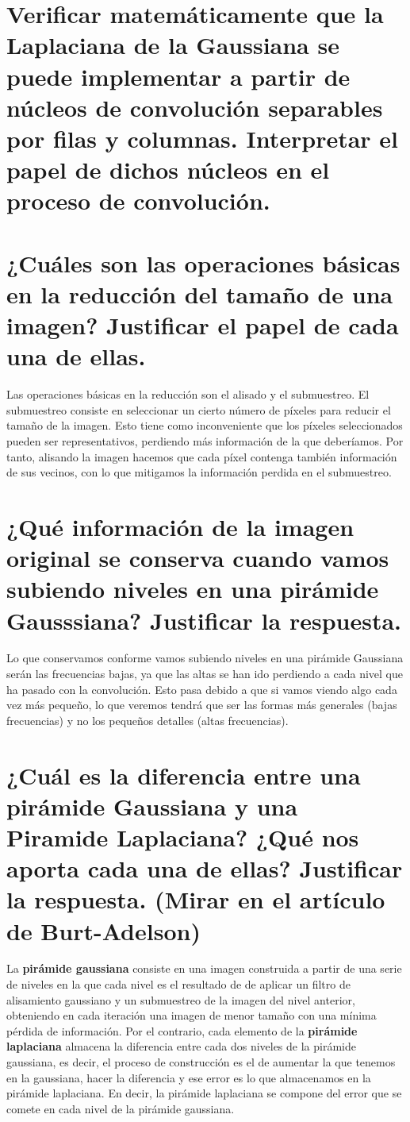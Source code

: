 \section{Verificar matemáticamente que la Laplaciana de la Gaussiana se puede implementar a partir de núcleos de convolución separables por filas y columnas. Interpretar el papel de dichos núcleos en el proceso de convolución.}

\section{¿Cuáles son las operaciones básicas en la reducción del tamaño de una imagen? Justificar el papel de cada una de ellas.}

Las operaciones básicas en la reducción son el alisado y el submuestreo. 
El submuestreo consiste en seleccionar un cierto número de píxeles para reducir el tamaño de la imagen. Esto tiene como inconveniente que los píxeles seleccionados pueden ser representativos, perdiendo más información de la que deberíamos. Por tanto, alisando la imagen hacemos que cada píxel contenga también información de sus vecinos, con lo que mitigamos la información perdida en el submuestreo.


\section{¿Qué información de la imagen original se conserva cuando vamos subiendo niveles en una pirámide Gausssiana? Justificar la respuesta.}

Lo que conservamos conforme vamos subiendo niveles en una pirámide Gaussiana serán las frecuencias bajas, ya que las altas se han ido perdiendo a cada nivel que ha pasado con la convolución. Esto pasa debido a que si vamos viendo algo cada vez más pequeño, lo que veremos tendrá que ser las formas más generales (bajas frecuencias) y no los pequeños detalles (altas frecuencias).


\section{¿Cuál es la diferencia entre una pirámide Gaussiana y una Piramide Laplaciana? ¿Qué nos aporta cada una de ellas? Justificar la respuesta. (Mirar en el artículo de Burt-Adelson)}

La \textbf{pirámide gaussiana} consiste en una imagen construida a partir de una serie de niveles en la que cada nivel es el resultado de de aplicar un filtro de alisamiento gaussiano y un submuestreo de la imagen del nivel anterior, obteniendo en cada iteración una imagen de menor tamaño con una mínima pérdida de información. Por el contrario, cada elemento de la\textbf{ pirámide laplaciana} almacena la diferencia entre cada dos niveles de la pirámide gaussiana, es decir, el proceso de construcción es el de aumentar la que tenemos en la gaussiana, hacer la diferencia y ese error es lo que almacenamos en la pirámide laplaciana. En decir, la pirámide laplaciana se compone del error que se comete en cada nivel de la pirámide gaussiana.\\


